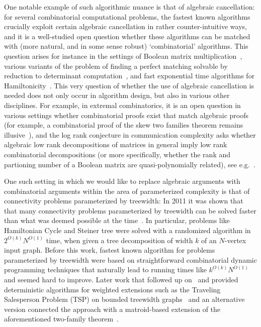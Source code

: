 \documentclass[11pt,a4paper]{article}
\begin{document}
One notable example of such algorithmic nuance is that of algebraic cancellation: for several combinatorial computational problems, the fastest known algorithms crucially exploit certain algebraic cancellation in rather counter-intuitive ways, and it is a well-studied open question whether these algorithms can be matched with (more natural, and in some sense robust) `combinatorial' algorithms. This question arises for instance in the settings of Boolean matrix multiplication~\cite{WilliamsW18}, various variants of the problem of finding a perfect matching solvable by reduction to determinant computation~\cite{KarpUW86,MulmuleyVV87}, and fast exponential time algorithms for Hamiltonicity~\cite{Bjorklund14}. This very question of whether the use of algebraic cancellation is needed does not only occur in algorithm design, but also in various other disciplines. For example, in extremal combinatorics, it is an open question in various settings whether combinatorial proofs exist that match algebraic proofs (for example, a combinatorial proof of the skew two families theorem remains illusive~\cite{calbet2023k_r}), and the log rank conjecture in communication complexity asks whether algebraic low rank decompositions of matrices in general imply low rank combinatorial decompositions (or more specifically, whether the rank and partioning number of a Boolean matrix are quasi-polynomially related), see e.g.~\cite{LovettA14}.

One such setting in which we would like to replace algebraic arguments with combinatorial arguments within the area of parameterized complexity is that of connectivity problems parameterized by treewidth: In 2011 it was shown that that many connectivity problems parameterized by treewidth can be solved faster than what was deemed possible at the time~\cite{CyganNPPRW22}. In particular, problems like Hamiltonian Cycle and Steiner tree were solved with a randomized algorithm in $2^{O(k)}N^{O(1)}$ time, when given a tree decomposition of width $k$ of an $N$-vertex input graph. Before this work, fastest known algorithm for problems parameterized by treewidth were based on straightforward combinatorial dynamic programming techniques that naturally lead to running times like $k^{O(k)}N^{O(1)}$ and seemed hard to improve. Later work that followed up on~\cite{CyganNPPRW22} and provided deterministic algorithms for weighted extensions such as the Traveling Salesperson Problem (TSP) on bounded treewidth graphs~\cite{BodlaenderCKN15} and an alternative version connected the approach with a matroid-based extension of the aforementioned two-family theorem~\cite{FominLPS16}.
\end{document}
